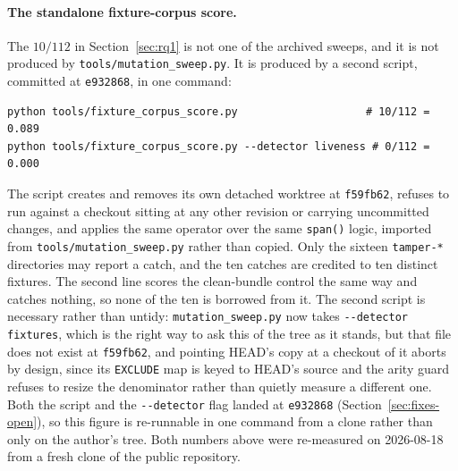 \documentclass[11pt]{article}
\begin{document}
\paragraph{The standalone fixture-corpus score.} The $10/112$ in Section~\ref{sec:rq1} is not
one of the archived sweeps, and it is not produced by \texttt{tools/mutation\_sweep.py}. It is
produced by a second script, committed at \texttt{e932868}, in one command:

\begin{Verbatim}[frame=single,fontsize=\small]
python tools/fixture_corpus_score.py                    # 10/112 = 0.089
python tools/fixture_corpus_score.py --detector liveness # 0/112 = 0.000
\end{Verbatim}

The script creates and removes its own detached worktree at \texttt{f59fb62}, refuses to run
against a checkout sitting at any other revision or carrying uncommitted changes, and applies
the same operator over the same \texttt{span()} logic, imported from
\texttt{tools/mutation\_sweep.py} rather than copied. Only the sixteen \texttt{tamper-*}
directories may report a catch, and the ten catches are credited to ten distinct fixtures. The
second line scores the clean-bundle control the same way and catches nothing, so none of the
ten is borrowed from it. The second script is necessary rather than untidy:
\texttt{mutation\_sweep.py} now takes \texttt{-{}-detector fixtures}, which is the right way to
ask this of the tree as it stands, but that file does not exist at \texttt{f59fb62}, and
pointing HEAD's copy at a checkout of it aborts by design, since its \texttt{EXCLUDE} map is
keyed to HEAD's source and the arity guard refuses to resize the denominator rather than
quietly measure a different one. Both the script and the \texttt{-{}-detector} flag landed at
\texttt{e932868} (Section~\ref{sec:fixes-open}), so this figure is re-runnable in one command
from a clone rather than only on the author's tree. Both numbers above were re-measured on
2026-08-18 from a fresh clone of the public repository.



\end{document}
